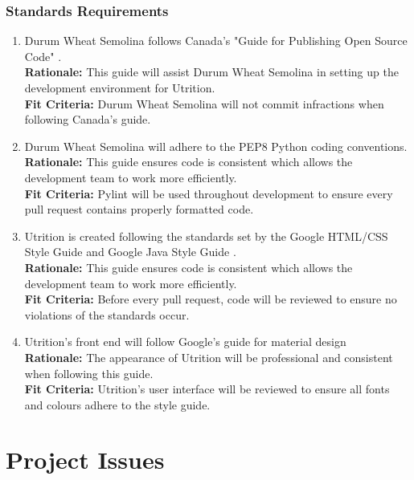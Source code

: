 \documentclass[12pt]{article}
\begin{document}
\subsubsection{Standards Requirements}
\begin{enumerate}[start=2,label={LR\arabic*.}]
	\item Durum Wheat Semolina follows Canada's "Guide for Publishing Open Source 
	Code" \citep{CanadianCode}.\\
	\textbf{Rationale:} This guide will assist Durum Wheat Semolina in setting up the development environment for Utrition.\\
	\textbf{Fit Criteria:} Durum Wheat Semolina will not commit infractions when following Canada’s guide.
	\item Durum Wheat Semolina will adhere to the PEP8 Python coding conventions.\\
	\textbf{Rationale:} This guide ensures code is consistent which allows the development team to work more efficiently. \\
	\textbf{Fit Criteria:} Pylint will be used throughout development to ensure every pull request contains properly formatted code.
	\item Utrition is created following the standards set by the Google HTML/CSS Style Guide \citep{HTMLCSSStyle} and Google Java Style Guide \citep{JavaScriptStyle}. \\
	\textbf{Rationale:} This guide ensures code is consistent which allows the development team to work more efficiently.\\
	\textbf{Fit Criteria:} Before every pull request, code will be reviewed to ensure no violations of the standards occur.
	\item Utrition's front end will follow Google's guide for material design \citep{StyleGuide}\\
	\textbf{Rationale:} The appearance of Utrition will be professional and consistent when following this guide. \\
	\textbf{Fit Criteria:} Utrition's user interface will be reviewed to ensure all fonts and colours adhere to the style guide.
\end{enumerate}

\section{Project Issues}
\end{document}
